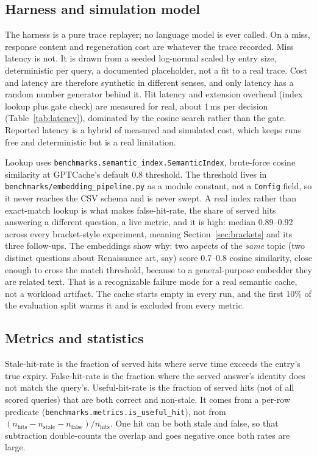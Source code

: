 \documentclass[10pt]{article}
\begin{document}
\subsection{Harness and simulation model}
\label{ssec:simmodel}

The harness is a pure trace replayer; no language model is ever called. On a miss, response
content and regeneration cost are whatever the trace recorded. Miss latency is not. It is
drawn from a seeded log-normal scaled by entry size, deterministic per query, a documented
placeholder, not a fit to a real trace. Cost and latency are therefore synthetic in
different senses, and only latency has a random number generator behind it. Hit latency and
extension overhead (index lookup plus gate check) are measured for real, about 1\,ms per
decision (Table~\ref{tab:latency}), dominated by the cosine search rather than the gate.
Reported latency is a hybrid of measured and simulated cost, which keeps runs free and
deterministic but is a real limitation.

Lookup uses \texttt{benchmarks.semantic\_index.SemanticIndex}, brute-force cosine similarity
at GPTCache's default 0.8 threshold. The threshold lives in
\texttt{benchmarks/\allowbreak embedding\_pipeline.py} as a module constant, not a
\texttt{Config} field, so it never reaches the CSV schema and is never swept. A real index
rather than exact-match lookup is what makes false-hit-rate, the share of served hits
answering a different question, a live metric, and it is high: median 0.89--0.92 across
every bracket-style experiment, meaning
Section~\ref{sec:brackets} and its three follow-ups. The
embeddings show why: two aspects of the \emph{same} topic (two distinct questions about
Renaissance art, say) score 0.7--0.8 cosine similarity, close enough to cross the match
threshold, because to a general-purpose embedder they are related text. That is a
recognizable failure mode for a real semantic cache, not a workload artifact. The cache
starts empty in every run, and the first 10\% of the evaluation split warms it and is
excluded from every metric.

\subsection{Metrics and statistics}
\label{ssec:stats}

Stale-hit-rate is the fraction of served hits where serve time exceeds the entry's true
expiry. False-hit-rate is the fraction where the served answer's identity does not match the
query's. Useful-hit-rate is the fraction of served hits (not of all scored queries) that are
both correct and non-stale. It comes from a per-row predicate
(\texttt{benchmarks.metrics.is\_useful\_hit}), not from
$(n_\text{hits} - n_\text{stale} - n_\text{false}) / n_\text{hits}$. One hit can be both stale
and false, so that subtraction double-counts the overlap and goes negative once both rates
are large.
\end{document}
